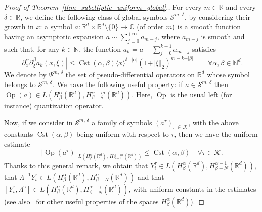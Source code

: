 \documentclass[AHL,Unicode,published]{cedram}
\newcommand*\R{\mathbb{R}}
\newcommand*\N{\mathbb{N}}
\newcommand*\C{\mathbb{C}}
\newcommand{\calK}{\mathcal{K}}
\newcommand{\calS}{\mathcal{S}}
\DeclareMathOperator{\Op}{Op}
\DeclareMathOperator{\Cst}{Cst}
\renewcommand{\leq}{\leqslant}
\let\oldforall\forall
\renewcommand*{\forall}{\mathrel{\oldforall}}
\begin{document}
\begin{proof}[Proof of Theorem~\ref{thm_subelliptic_uniform_global}.]
For every $m\in\R$ and every $\delta\in\R$, we define the following class of global symbols $\calS^{m,\,\delta}$, by considering their growth in $x$: a symbol $a:\R^d\times\R^d\setminus \{0\}\rightarrow \C$ (of order $m$) is a smooth function having an asymptotic expansion $a\sim \sum _{j=0}^{+\infty} a_{m-j}$, where $a_{m-j}$ is smooth and such that, for any $k\in\N$, the function $a_k=a-\sum _{j=0}^{k-1}a_{m-j}$ satisfies
\[
\left\vert \partial_x^\alpha \partial_\xi^\beta a_k (x,\xi)\right\vert \leq \Cst(\alpha,\beta) \langle x\rangle^{\delta-\vert\alpha\vert} (1+\Vert\xi\Vert_2)^{m-k-\vert\beta\vert} \qquad\forall \alpha,\beta\in\N^d.
\]
We denote by $\Psi^{m,\,\delta}$ the set of pseudo-differential operators on $\R^d$ whose symbol belongs to $\calS^{m,\,\delta}$. We have the following useful property: if $a\in\calS^{m,\,\delta}$ then $\Op(a) \in L(H^\alpha_\beta(\R^d),H^{\alpha-m}_{\beta-\delta}(\R^d))$. Here, $\Op$ is the usual left (for instance) quantization operator.

Now, if we consider in $\calS^{m,\,\delta}$ a family of symbols $(a^\tau)_{\tau\,\in\,\calK}$, with the above constants $\Cst(\alpha,\beta)$ being uniform with respect to $\tau$, then we have the uniform estimate
\[
\left\Vert \Op(a^\tau)\right\Vert_{L\left(H^\alpha_\beta\left(\R^d\right),\,H^{\alpha-m}_{\beta-\delta}\left(\R^d\right)\right)}\leq \Cst(\alpha,\beta) \quad\forall \tau\in\calK.
\]
Thanks to this general remark, we obtain that $Y^\tau_i \in L(H^\alpha_\beta(\R^d),H^{\alpha-1}_{\beta-N}(\R^d))$, that $\Lambda^{-1}Y^\tau_i \in L(H^\alpha_\beta(\R^d),H^\alpha_{\beta-N}(\R^d))$ and that $[Y^\tau_i,\Lambda^\gamma] \in L(H^\alpha_\beta(\R^d),H^{\alpha-\gamma}_{\beta-N}(\R^d))$, with uniform constants in the estimates (see also~\cite[Lemma~3.2]{EckmannHairer} for other useful properties of the spaces $H^\alpha_\beta(\R^d)$).


\end{proof}
\end{document}
